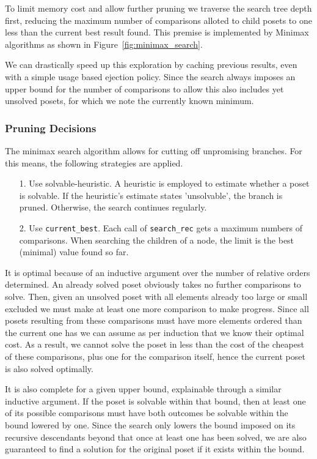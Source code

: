 \documentclass[10pt,journal,compsoc]{IEEEtran}
\begin{document}
To limit memory cost and allow further pruning we traverse the search tree depth first, reducing the maximum number of comparisons alloted to child posets to one less than the current best result found.
This premise is implemented by Minimax algorithms as shown in Figure~\ref{fig:minimax_search}.

We can drastically speed up this exploration by caching previous results, even with a simple usage based ejection policy. Since the search always imposes an upper bound for the number of comparisons to allow this also includes yet unsolved posets, for which we note the currently known minimum.

\subsubsection{Pruning Decisions}
The minimax search algorithm allows for cutting off unpromising branches.
For this means, the following strategies are applied.

\begin{enumerate}
  \item[1.]
    Use solvable-heuristic. A heuristic is employed to estimate whether a poset is solvable. If the heuristic's estimate states 'unsolvable', the branch is pruned.
    Otherwise, the search continues regularly.
  \item[2.]
    Use \texttt{current\_best}. Each call of \texttt{search\_rec} gets a maximum numbers of comparisons.
    When searching the children of a node, the limit is the best (minimal) value found so far.
\end{enumerate}

It is optimal because of an inductive argument over the number of relative orders determined.
An already solved poset obviously takes no further comparisons to solve.
Then, given an unsolved poset with all elements already too large or small excluded we must make at least one more comparison to
make progress.
Since all posets resulting from these comparisons must have more elements ordered than the current one has we can assume as per induction that we know their optimal cost.
As a result, we cannot solve the poset in less than the cost of the cheapest of these comparisons, plus one for the comparison itself, hence the current poset is also solved optimally.

It is also complete for a given upper bound, explainable through a similar inductive argument.
If the poset is solvable within that bound, then at least one of its possible comparisons must have both outcomes be solvable within the bound lowered by one.
Since the search only lowers the bound imposed on its recursive descendants beyond that once at least one has been solved, we are also guaranteed to find a solution for the original poset if it exists within the bound.
\end{document}
